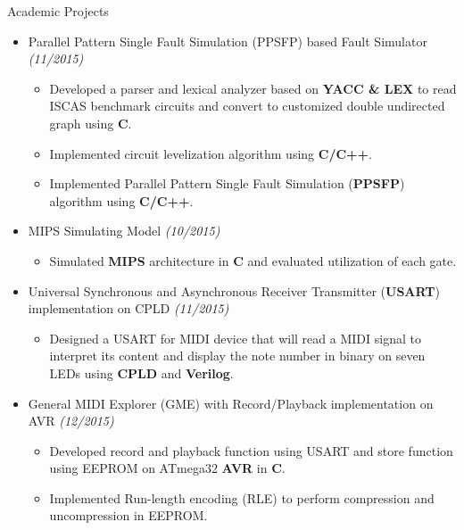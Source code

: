 \documentclass{resume} %
\begin{document}

\begin{rSection}{Academic Projects} 

\begin{itemize}\itemsep -2pt

\item Parallel Pattern Single Fault Simulation (PPSFP) based Fault Simulator \textit{(11/2015)}
    \begin{itemize}\itemsep -3pt
    \item Developed a parser and lexical analyzer based on \textbf{YACC \& LEX} to read ISCAS benchmark circuits and convert to customized double undirected graph using \textbf{C}.
    \item Implemented circuit levelization algorithm using \textbf{C/C++}.
    \item Implemented Parallel Pattern Single Fault Simulation (\textbf{PPSFP}) algorithm using \textbf{C/C++}.
    \end{itemize}

\item MIPS Simulating Model \textit{(10/2015)}
    \begin{itemize}\itemsep -3pt
    \item Simulated \textbf{MIPS} architecture in \textbf{C} and evaluated utilization of each gate.
    \end{itemize}

\item Universal Synchronous and Asynchronous Receiver Transmitter (\textbf{USART})  implementation on CPLD \textit{(11/2015)}
    \begin{itemize}\itemsep -3pt
    \item Designed a USART for MIDI device that will read a MIDI signal to interpret its content and display the note number in binary on seven LEDs using \textbf{CPLD} and \textbf{Verilog}.
    \end{itemize}

\item  General MIDI Explorer (GME) with Record/Playback implementation on AVR \textit{(12/2015)}
    \begin{itemize}\itemsep -3pt
    \item Developed record and playback function using USART and store function using EEPROM on ATmega32 \textbf{AVR} in \textbf{C}.
    \item Implemented Run-length encoding (RLE) to perform compression and uncompression in EEPROM.
    \end{itemize}
\end{itemize}

\end{rSection}
\end{document}
